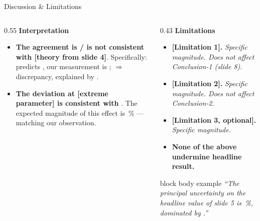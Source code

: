 \begin{frame}{Discussion \& Limitations}
  \begin{columns}[T, totalwidth=\textwidth]
    \begin{column}{0.55\textwidth}
      \textbf{\color{sustBlueDark}Interpretation}\\[2pt]
      \begin{itemize}\setlength\itemsep{3pt}
        \item \textbf{The agreement is / is not consistent with [theory from
              slide 4]}. Specifically:  predicts \highlight{[value]}, our
              measurement is \highlight{[value]}; $\Rightarrow$
               discrepancy, explained by
              .
        \item \textbf{The deviation at [extreme parameter] is consistent with}
              . The
              expected magnitude of this effect is \highlight{[X]}\,$\%$
              — matching our observation.
      \end{itemize}
      \vspace{4pt}
    \end{column}

    \begin{column}{0.43\textwidth}
      \textbf{\color{sustBlueDark}Limitations}
      \begin{itemize}\setlength\itemsep{3pt}
        \item \textbf{[Limitation 1].} \itshape Specific magnitude. Does not
              affect Conclusion-1 (slide 8).
        \item \textbf{[Limitation 2].} \itshape Specific magnitude. Does not
              affect Conclusion-2.
        \item \textbf{[Limitation 3, optional].} \itshape Specific magnitude.
        \item \textbf{None of the above undermine headline result.}
      \end{itemize}

      \vspace{6pt}
      \begin{beamercolorbox}[sep=4pt]{block body example}
        \scriptsize\color{sustBlueDark}\itshape ``The principal uncertainty on
        the headline value of slide 5 is \,\%, dominated by
        .''
      \end{beamercolorbox}
    \end{column}
  \end{columns}
\end{frame}
